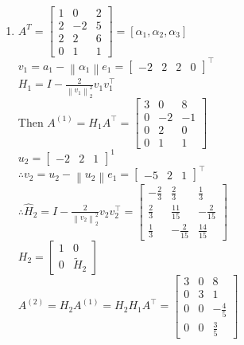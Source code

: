 \documentclass[english,onecolumn]{IEEEtran}
\begin{document}
\begin{enumerate}
\item $A^{T}=\left[\begin{array}{ccc}1 & 0 & 2 \\ 2 & -2 & 5 \\ 2 & 2 & 6 \\ 0 & 1 & 1\end{array}\right]=\left[\alpha_{1},\alpha_{2}, \alpha_{3}\right]$\\
$v_{1}=a_{1}-\left\|\alpha_{1}\right\| e_{1}=\left[\begin{array}{cccc}-2 & 2 & 2 & 0\end{array}\right]^{\top}$\\
$H_{1}=I-\frac{2}{\left\|v_{1}\right\|_{2}^{2}} v_{1} v_{1}^{\top}$\\
Then $A^{(1)}=H_{1} A^{\top}=\left[\begin{array}{rrr}3 & 0 & 8 \\ 0 & -2 & -1 \\ 0 & 2 & 0 \\ 0 & 1 & 1\end{array}\right]$\\
$u_{2}=\left[\begin{array}{ccc}-2 & 2 & 1\end{array}\right]^{1}$\\
$\therefore v_{2}=u_{2}-\left\|u_{2}\right\| e_{1}=\left[\begin{array}{ccc}-5 & 2 & 1\end{array}\right]^{\top}$\\
$\therefore \hat{H}_{2}=I-\frac{2}{\left\|v_{2}\right\|_{2}^{2}} v_{2} v_{2}^{\top}=\left[\begin{array}{rrr}-\frac{2}{3} & \frac{2}{3} & \frac{1}{3} \\ \frac{2}{3} & \frac{11}{15} & -\frac{2}{15} \\ \frac{1}{3} & -\frac{2}{15} & \frac{14}{15}\end{array}\right]$\\
$H_{2}=\left[\begin{array}{ll}1 & 0 \\ 0 & \tilde{H}_{2}\end{array}\right]$\\
$A^{(2)}=H_{2} A^{(1)}=H_{2} H_{1} A^{\top}=\left[\begin{array}{ccc}3 & 0 & 8 \\ 0 & 3 & 1 \\ 0 & 0 & -\frac{4}{5} \\ 0 & 0 & \frac{3}{5}\end{array}\right]$\\

\end{enumerate}
\end{document}
